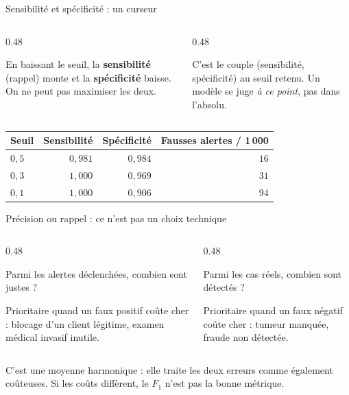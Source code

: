 \begin{frame}{Sensibilité et spécificité : un curseur}
\begin{columns}[t]
\begin{column}{0.48\textwidth}
\begin{ebox}
En baissant le seuil, la \textbf{sensibilité} (rappel) monte et la
\textbf{spécificité} baisse. On ne peut pas maximiser les deux.
\end{ebox}
\end{column}
\begin{column}{0.48\textwidth}
\begin{kbox}
C'est le couple (sensibilité, spécificité) au seuil retenu. Un modèle se juge
\emph{à ce point}, pas dans l'absolu.
\end{kbox}
\end{column}
\end{columns}
\vspace{2mm}
\begin{center}
\small
\begin{tabular}{@{}lrrr@{}}
\toprule
\textbf{Seuil} & \textbf{Sensibilité} & \textbf{Spécificité} & \textbf{Fausses alertes / 1\,000} \\
\midrule
$0{,}5$ & $0{,}981$ & $0{,}984$ & $16$ \\
$0{,}3$ & $1{,}000$ & $0{,}969$ & $31$ \\
$0{,}1$ & $1{,}000$ & $0{,}906$ & $94$ \\
\bottomrule
\end{tabular}
\end{center}
\end{frame}

\begin{frame}{Précision ou rappel : ce n'est pas un choix technique}
\begin{columns}[t]
\begin{column}{0.48\textwidth}
\begin{ebox}[Précision]
Parmi les alertes déclenchées, combien sont justes ?

\vspace{1mm}
Prioritaire quand un faux positif coûte cher : blocage d'un client légitime,
examen médical invasif inutile.
\end{ebox}
\end{column}
\begin{column}{0.48\textwidth}
\begin{ebox}[Rappel]
Parmi les cas réels, combien sont détectés ?

\vspace{1mm}
Prioritaire quand un faux négatif coûte cher : tumeur manquée, fraude non
détectée.
\end{ebox}
\end{column}
\end{columns}
\vspace{2mm}
\begin{wbox}
C'est une moyenne harmonique : elle traite les deux erreurs comme également
coûteuses. Si les coûts diffèrent, le $F_1$ n'est pas la bonne métrique.
\end{wbox}
\end{frame}

